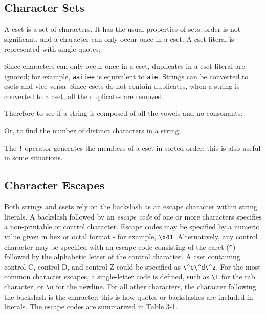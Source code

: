 \subsection{Character Sets}

A cset is a set of characters. It has the usual properties of sets:
order is not significant, and a character can only occur once in a
cset. A cset literal is represented with single
quotes:


Since characters can only occur once in a cset, duplicates in a cset
literal are ignored; for example,
\texttt{{\textquotesingle}aaiiee{\textquotesingle}} is equivalent to
\texttt{{\textquotesingle}aie{\textquotesingle}}. Strings can be
converted to csets and vice versa. Since csets do not contain
duplicates, when a string is converted to a cset, all the duplicates
are removed.

Therefore to see if a string is composed of all the vowels and no
consonants:


Or, to find the number of distinct characters in a string:


The \texttt{!} operator generates the members of a cset in sorted order;
this is also useful in some situations.

\subsection{Character Escapes}

Both strings and csets rely on the backslash as an escape character
within string literals. A backslash followed by an \textit{escape code} of one or more characters specifies a
non-printable or control character. Escape codes may be specified by a
numeric value given in hex or octal format - for example,
\texttt{{\textquotedbl}{\textbackslash}x41{\textquotedbl}}.
Alternatively, any control character may be specified with an escape
code consisting of the caret (\texttt{\^{}}) followed by the alphabetic
letter of the control character. A cset containing control-C,
control-D, and control-Z could be specified as
\texttt{{\textquotesingle}{\textbackslash}\^{}c{\textbackslash}\^{}d{\textbackslash}\^{}z{\textquotesingle}}.
For the most common character escapes, a single-letter code is defined,
such as \texttt{{\textquotedbl}{\textbackslash}t{\textquotedbl}} for
the tab character, or
\texttt{{\textquotedbl}{\textbackslash}n{\textquotedbl}} for the
newline. For all other characters, the character following the
backslash is the character; this is how quotes or backslashes are
included in literals. The escape codes are summarized in Table 3-1.

